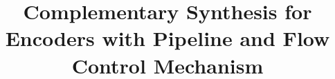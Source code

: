 \documentclass[conference]{IEEEtran}
\begin{document}
%
\title{Complementary Synthesis for Encoders with Pipeline and Flow Control Mechanism}




% 
\end{document}

